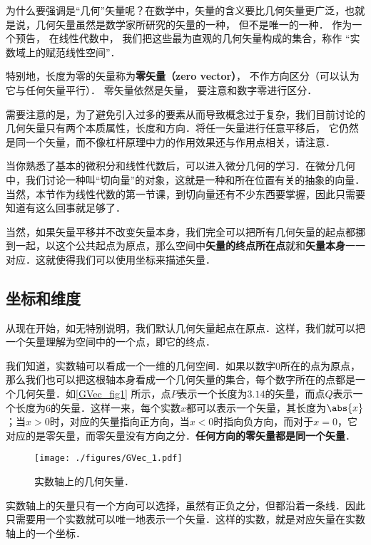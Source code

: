 为什么要强调是“几何”矢量呢？在数学中，矢量的含义要比几何矢量更广泛，也就是说，几何矢量虽然是数学家所研究的矢量的一种， 但不是唯一的一种． 作为一个预告， 在线性代数中， 我们把这些最为直观的几何矢量构成的集合，称作 “实数域上的赋范线性空间”．

特别地，长度为零的矢量称为\textbf{零矢量（zero vector）}， 不作方向区分（可以认为它与任何矢量平行）． 零矢量依然是矢量， 要注意和数字零进行区分．

需要注意的是，为了避免引入过多的要素从而导致概念过于复杂，我们目前讨论的几何矢量只有两个本质属性，长度和方向．将任一矢量进行任意平移后， 它仍然是同一个矢量，而不像杠杆原理中力的作用效果还与作用点相关，请注意．

当你熟悉了基本的微积分和线性代数后，可以进入微分几何的学习．在微分几何中，我们讨论一种叫“切向量”的对象，这就是一种和所在位置有关的抽象的向量．当然，本节作为线性代数的第一节课，到切向量还有不少东西要掌握，因此只需要知道有这么回事就足够了．


当然，如果矢量平移并不改变矢量本身，我们完全可以把所有几何矢量的起点都挪到一起，以这个公共起点为原点，那么空间中\textbf{矢量的终点所在点}就和\textbf{矢量本身}一一对应．这就使得我们可以使用坐标来描述矢量．




\subsection{坐标和维度}

从现在开始，如无特别说明，我们默认几何矢量起点在原点．这样，我们就可以把一个矢量理解为空间中的一个点，即它的终点．

我们知道，实数轴可以看成一个一维的几何空间．如果以数字$0$所在的点为原点，那么我们也可以把这根轴本身看成一个几何矢量的集合，每个数字所在的点都是一个几何矢量．如\autoref{GVec_fig1} 所示，点$P$表示一个长度为$3.14$的矢量，而点$Q$表示一个长度为$6$的矢量．这样一来，每个实数$x$都可以表示一个矢量，其长度为$\abs{x}$；当$x>0$时，对应的矢量指向正方向，当$x<0$时指向负方向，而对于$x=0$，它对应的是零矢量，而零矢量没有方向之分．\textbf{任何方向的零矢量都是同一个矢量}．

\begin{figure}[ht]
\centering
\texttt{[image: ./figures/GVec\_1.pdf]}
\caption{实数轴上的几何矢量．} \label{GVec_fig1}
\end{figure}

实数轴上的矢量只有一个方向可以选择，虽然有正负之分，但都沿着一条线．因此只需要用一个实数就可以唯一地表示一个矢量．这样的实数，就是对应矢量在实数轴上的一个坐标．

